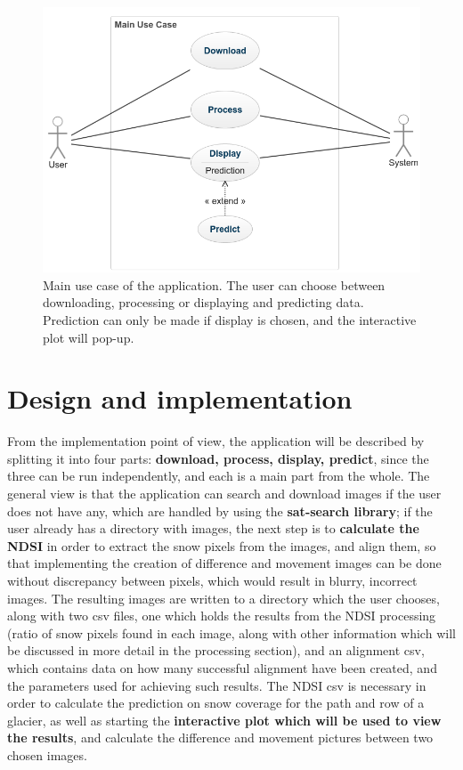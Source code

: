 \documentclass[12pt, a4paper]{report}
\begin{document}
	\begin{figure}[H]
		\centering
		\includegraphics[scale=2]{main_use_case.png}
		\caption{Main use case of the application. The user can choose between downloading, processing or displaying and predicting data. Prediction can only be made if display is chosen, and the interactive plot will pop-up.}
		\label{fig:main_use_case}
	\end{figure}
	
	\newpage{}

	\chapter{Design and implementation}
	
	From the implementation point of view, the application will be described by splitting it into four parts: \textbf{download, process, display, predict}, since the three can be run independently, and each is a main part from the whole. The general view is that the application can search and download images if the user does not have any, which are handled by using the \textbf{sat-search library}; if the user already has a directory with images, the next step is to \textbf{calculate the NDSI} in order to extract the snow pixels from the images, and align them, so that implementing the creation of difference and movement images can be done without discrepancy between pixels, which would result in blurry, incorrect images. The resulting images are written to a directory which the user chooses, along with two csv files, one which holds the results from the NDSI processing (ratio of snow pixels found in each image, along with other information which will be discussed in more detail in the processing section), and an alignment csv, which contains data on how many successful alignment have been created, and the parameters used for achieving such results. The NDSI csv is necessary in order to calculate the prediction on snow coverage for the path and row of a glacier, as well as starting the \textbf{interactive plot which will be used to view the results}, and calculate the difference and movement pictures between two chosen images. 
	
\end{document}
